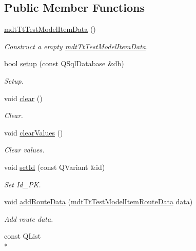 \subsection*{Public Member Functions}
\begin{DoxyCompactItemize}
\item 
\hyperlink{classmdt_tt_test_model_item_data_a3267e2e1d265a9419aca11f2f40d5cd8}{mdt\-Tt\-Test\-Model\-Item\-Data} ()
\begin{DoxyCompactList}\small\item\em Construct a empty \hyperlink{classmdt_tt_test_model_item_data}{mdt\-Tt\-Test\-Model\-Item\-Data}. \end{DoxyCompactList}\item 
bool \hyperlink{classmdt_tt_test_model_item_data_a531b82928279a22568fdb89aeca3e6b9}{setup} (const Q\-Sql\-Database \&db)
\begin{DoxyCompactList}\small\item\em Setup. \end{DoxyCompactList}\item 
void \hyperlink{classmdt_tt_test_model_item_data_a24b5103634fe894261593dbca443cb6d}{clear} ()
\begin{DoxyCompactList}\small\item\em Clear. \end{DoxyCompactList}\item 
void \hyperlink{classmdt_tt_test_model_item_data_a87655b5eae9d82dd6494ecb4ea26d350}{clear\-Values} ()
\begin{DoxyCompactList}\small\item\em Clear values. \end{DoxyCompactList}\item 
void \hyperlink{classmdt_tt_test_model_item_data_a9c8237673ec651741bef29695720c8d2}{set\-Id} (const Q\-Variant \&id)
\begin{DoxyCompactList}\small\item\em Set Id\-\_\-\-P\-K. \end{DoxyCompactList}\item 
void \hyperlink{classmdt_tt_test_model_item_data_a2c8b517b75e84a41b3d8cd71ca7eb3df}{add\-Route\-Data} (\hyperlink{classmdt_tt_test_model_item_route_data}{mdt\-Tt\-Test\-Model\-Item\-Route\-Data} data)
\begin{DoxyCompactList}\small\item\em Add route data. \end{DoxyCompactList}\item 
const Q\-List\\*

\end{DoxyCompactItemize}
